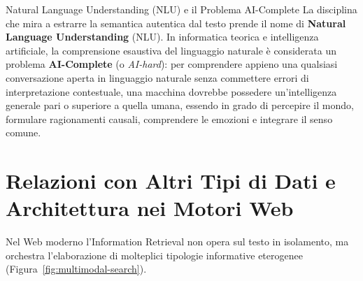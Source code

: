 \begin{alertblock}{Natural Language Understanding (NLU) e il Problema AI-Complete}
La disciplina che mira a estrarre la semantica autentica dal testo prende il nome di \textbf{Natural Language Understanding} (NLU). 
In informatica teorica e intelligenza artificiale, la comprensione esaustiva del linguaggio naturale \`e considerata un problema \textbf{AI-Complete} (o \textit{AI-hard}): per comprendere appieno una qualsiasi conversazione aperta in linguaggio naturale senza commettere errori di interpretazione contestuale, una macchina dovrebbe possedere un'intelligenza generale pari o superiore a quella umana, essendo in grado di percepire il mondo, formulare ragionamenti causali, comprendere le emozioni e integrare il senso comune.
\end{alertblock}

\FloatBarrier
\section{Relazioni con Altri Tipi di Dati e Architettura nei Motori Web}
\label{sec:relazioni-dati-motori-web}

Nel Web moderno l'Information Retrieval non opera sul testo in isolamento, ma orchestra l'elaborazione di molteplici tipologie informative eterogenee (Figura~\ref{fig:multimodal-search}).

